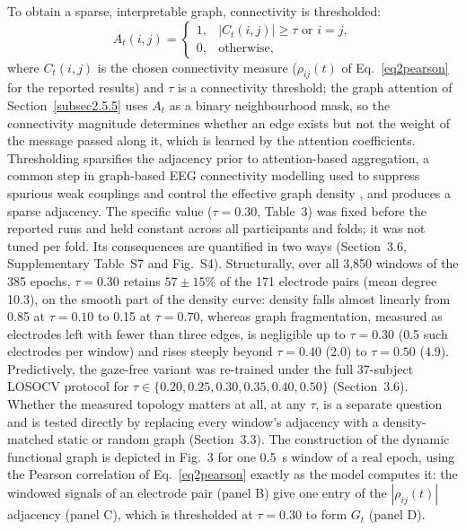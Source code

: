 \documentclass[pdflatex,sn-basic,Numbered]{sn-jnl}
\begin{document}
To obtain a sparse, interpretable graph, connectivity is thresholded:
\begin{equation}
A_t(i,j) = \begin{cases} 1, & |C_t(i,j)| \geq \tau \text{ or } i=j, \\ 0, & \text{otherwise}, \end{cases} \label{eq3}
\end{equation}
where $C_t(i,j)$ is the chosen connectivity measure ($\rho_{ij}(t)$ of Eq.~\eqref{eq2pearson} for the reported results) and $\tau$ is a connectivity threshold; the graph attention of Section~\ref{subsec2.5.5} uses $A_t$ as a binary neighbourhood mask, so the connectivity magnitude determines whether an edge exists but not the weight of the message passed along it, which is learned by the attention coefficients. Thresholding sparsifies the adjacency prior to attention-based aggregation, a common step in graph-based EEG connectivity modelling used to suppress spurious weak couplings and control the effective graph density \cite{ref19,ref20,ref21,ref22}, and produces a sparse adjacency. The specific value ($\tau=0.30$, Table~3) was fixed before the reported runs and held constant across all participants and folds; it was not tuned per fold. Its consequences are quantified in two ways (Section~3.6, Supplementary Table~S7 and Fig.~S4). Structurally, over all 3{,}850 windows of the 385 epochs, $\tau=0.30$ retains $57\pm15\%$ of the 171 electrode pairs (mean degree 10.3), on the smooth part of the density curve: density falls almost linearly from 0.85 at $\tau=0.10$ to 0.15 at $\tau=0.70$, whereas graph fragmentation, measured as electrodes left with fewer than three edges, is negligible up to $\tau=0.30$ (0.5 such electrodes per window) and rises steeply beyond $\tau=0.40$ (2.0) to $\tau=0.50$ (4.9). Predictively, the gaze-free variant was re-trained under the full 37-subject LOSOCV protocol for $\tau\in\{0.20,0.25,0.30,0.35,0.40,0.50\}$ (Section~3.6). Whether the measured topology matters at all, at any $\tau$, is a separate question and is tested directly by replacing every window's adjacency with a density-matched static or random graph (Section~3.3). The construction of the dynamic functional graph is depicted in Fig.~3 for one 0.5~s window of a real epoch, using the Pearson correlation of Eq.~\eqref{eq2pearson} exactly as the model computes it: the windowed signals of an electrode pair (panel B) give one entry of the $|\rho_{ij}(t)|$ adjacency (panel C), which is thresholded at $\tau=0.30$ to form $G_t$ (panel D).
\end{document}
